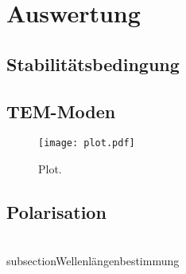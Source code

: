 \section{Auswertung}
\label{sec:Auswertung}



\subsection{Stabilitätsbedingung}
\label{subsec:Stabil}

\subsection{TEM-Moden}
\label{}

\begin{figure}
  \centering
  \texttt{[image: plot.pdf]}
  \caption{Plot.}
  \label{fig:plot}
\end{figure}


\subsection{Polarisation}
\label{subsec:Polarisation}

\\subsection{Wellenlängenbestimmung}
